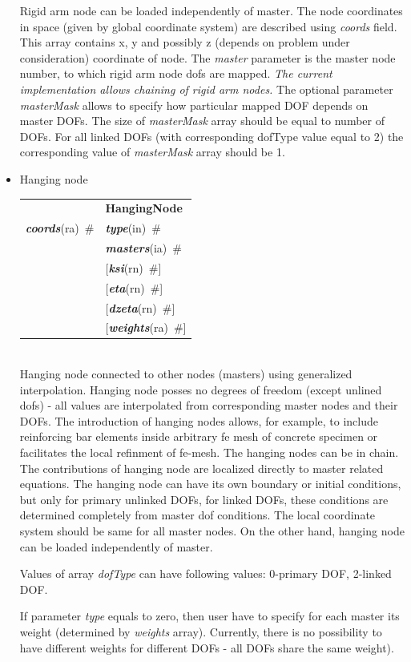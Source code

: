\documentclass[a4paper]{article}
\makeatletter
\newcommand{\param}[1]{{\em #1}}
\newcommand{\keywordnotype}[1]{\mbox{{\it{\bf{#1}}}}}
\newcommand{\keyword}[2]{\mbox{{\keywordnotype{#1}\tiny (#2)}}}
\newcommand{\entKeywordInst}[1]{\mbox{{\bf{{#1}}}}}
\newcommand{\field}[2]{\mbox{\keyword{#1}{#2}~\#}}
\newcommand{\optField}[2]{\mbox{[\field{#1}{#2}]}}
\newenvironment{record}[1][]{\begin{tabular}{|ll}}{\end{tabular}\\}
\newcommand{\recentry}[2]{{#1}&{#2}\\}
\newcounter{rcc}
\newenvironment{record}[1][\textwidth]{\setcounter{rcc}{0}\begin{tabular*}{#1}{|ll@{\extracolsep{\fill}}r}}{\end{tabular*}\\}
\newcommand{\recentry}[2]{\ifthenelse{\value{rcc}>0}{&$\backslash$ \\}{\setcounter{rcc}{1}}{#1}&{#2}}
\makeatother
\begin{document}
\begin{itemize}
Rigid arm node can be loaded
independently of master. The node coordinates in space (given by
global coordinate system) are described using \param{coords}
field. This array contains x, y and possibly z (depends on problem
under consideration) coordinate of node. The \param{master} parameter is the
master node number, to which rigid arm node dofs are mapped.
{\em The current implementation allows chaining of rigid arm nodes.}
The optional parameter \param{masterMask} allows to specify how
particular mapped DOF depends on master DOFs. The size of \param{masterMask} array 
should be equal to number of DOFs. For all linked DOFs (with
corresponding dofType value equal to 2) the corresponding value of
\param{masterMask} array should be 1.

\item Hanging node

  \begin{record}[0.9\textwidth]
    \recentry{}{\entKeywordInst{HangingNode}}{\field{coords}{ra}}
    \recentry{}{\field{type}{in}} \recentry{}{\field{masters}{ia}}
    \recentry{}{\optField{ksi}{rn}}
    \recentry{}{\optField{eta}{rn}} \recentry{}{\optField{dzeta}{rn}} \recentry{}{\optField{weights}{ra}}
  \end{record}
  Hanging node connected to other nodes (masters) using generalized interpolation.
Hanging node posses no degrees of freedom	(except unlined dofs) - all values are
interpolated from corresponding master nodes and their DOFs.
The introduction of hanging nodes allows, for example, to include reinforcing bar elements inside 
arbitrary fe mesh of concrete specimen or facilitates the local
refinment of fe-mesh. The hanging nodes can be in chain.
The contributions of hanging node are localized directly to master related equations.
The hanging node can have its own boundary or initial conditions, but
only for primary unlinked DOFs, for linked DOFs, these conditions are
determined completely from master dof conditions. 
The local coordinate system should be same for all master nodes.
On the other hand, hanging node can be loaded independently of
master.

Values of array \param{dofType} can have following values: {0-primary
 DOF, 2-linked DOF}.

If parameter \param{type} equals to zero, then user have to specify
for each master its weight (determined by \param{weights} array).
Currently, there is no possibility to have different weights for
different DOFs - all DOFs share the same weight).


\end{itemize}
\end{document}
